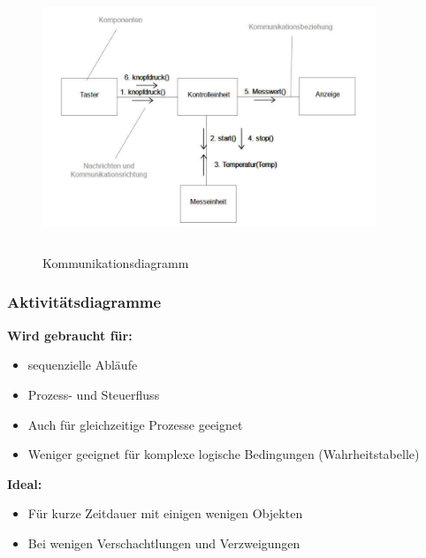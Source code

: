 \begin{figure}[h]
	\centering
	\includegraphics[height=8cm, width = 10cm,]{images/Modellierung/Kommunikationsdiagramm}
	\caption{Kommunikationsdiagramm}
\end{figure}


\subsubsection{Aktivitätsdiagramme }

\begin{multicols}{2}
	\textbf{Wird gebraucht für:}
	\begin{itemize}
		\item sequenzielle Abläufe
		\item Prozess- und Steuerfluss
		\item Auch für gleichzeitige Prozesse geeignet
		\item Weniger geeignet für komplexe logische Bedingungen (Wahrheitstabelle)
	\end{itemize}
	\columnbreak
	
	\textbf{Ideal:}
	\begin{itemize}
		\item Für kurze Zeitdauer mit einigen wenigen Objekten
		\item Bei wenigen Verschachtlungen und Verzweigungen
	\end{itemize}
\end{multicols}

